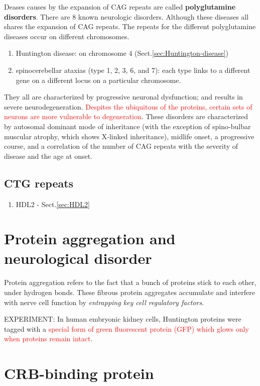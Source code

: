 Deases causes by the expansion of CAG repeats are called {\bf polyglutamine
disorders}. There are 8 known neurologic disorders. Although these diseases all
shares the expansion of CAG repeats. The repeats for the different polyglutamine
diseases occur on different chromosomes.
  \begin{enumerate}
    \item Huntington disease: on chromosome 4 (Sect.\ref{sec:Huntington-disease})
    
    \item spinocerebellar ataxias (type 1, 2, 3, 6, and 7): each type links to a
    different gene on a different locus on a particular chromosome.
  \end{enumerate}
They all are characterized by progressive neuronal dysfunction; and results in
severe neurodegeneration. \textcolor{red}{Despites the ubiquitous of the
proteins, certain sets of neurons are more vulnerable to degeneration}.
These disorders are characterized by autosomal dominant mode of inheritance
(with the exception of spino-bulbar muscular atrophy, which shows X-linked
inheritance), midlife onset, a progressive course, and a correlation of the
number of CAG repeats with the severity of disease and the age at onset.


\subsection{CTG repeats}

\begin{enumerate}
  \item  HDL2 - Sect.\ref{sec:HDL2}
\end{enumerate}


\section{Protein aggregation and neurological disorder}
\label{sec:aggregation-2-neurological-disease}

Protein aggregation refers to the fact that a bunch of proteins stick to each
other, under hydrogen bonds. These fibrous protein aggregates accumulate and
interfere with nerve cell function by {\it entrapping key cell regulatory
factors}.

EXPERIMENT: In human embryonic kidney cells, Huntington proteins were tagged
with a \textcolor{red}{special form of green fluorescent protein
(GFP) which glows only when proteins remain intact}.
 
 
\section{CRB-binding protein}
\label{sec:CRB-binding_protein}

